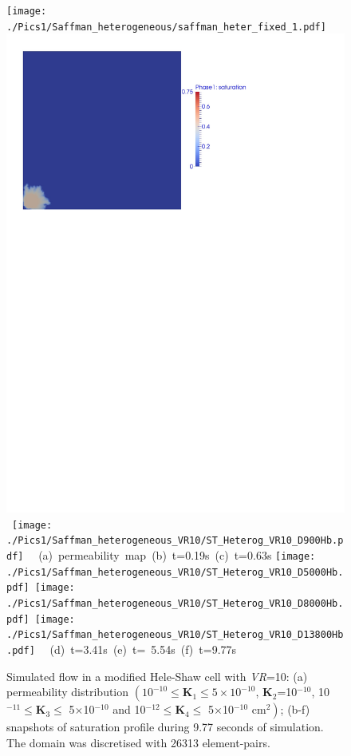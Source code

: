 \begin{landscape}
  \begin{figure}[ht]
  \vbox{\vspace{-.5cm}
      \hbox{\texttt{[image: ./Pics1/Saffman\_heterogeneous/saffman\_heter\_fixed\_1.pdf]}
            \includegraphics[width=.57\textwidth]{./Pics1/Saffman_heterogeneous_VR10/ST_Heterog_VR10_D200Hbcd.pdf} 
            \texttt{[image: ./Pics1/Saffman\_heterogeneous\_VR10/ST\_Heterog\_VR10\_D900Hb.pdf]} }
      \hbox{\hspace{1.0cm} (a) permeability map \hspace{3.cm} (b) t=0.19s \hspace{4.0cm} (c) t=0.63s}
      \vspace{0.5cm}
      \hbox{\texttt{[image: ./Pics1/Saffman\_heterogeneous\_VR10/ST\_Heterog\_VR10\_D5000Hb.pdf]}
            \texttt{[image: ./Pics1/Saffman\_heterogeneous\_VR10/ST\_Heterog\_VR10\_D8000Hb.pdf]}
            \texttt{[image: ./Pics1/Saffman\_heterogeneous\_VR10/ST\_Heterog\_VR10\_D13800Hb.pdf]} }
      \hbox{\hspace{2.cm} (d) t=3.41s \hspace{3.5cm} (e) t= 5.54s\hspace{4.5cm} (f) t=9.77s }}
\caption{Simulated flow in a modified Hele-Shaw cell with {\it VR}=10: (a) permeability distribution $\left(\text{10}^{-10}\le\mathbf{K}_{1}\le\text{5}\times\text{10}^{-10}\right.$, {\bf K}$_{2}$=10$^{-10}$, 10$^{-11}\le\mathbf{K}_{3}\le$ 5$\times$10$^{-10}$ and 10$^{-12}\le\mathbf{K}_{4}\le$ 5$\times$10$\left.^{-10}\text{ cm}^{2}\right)$; (b-f) snapshots of saturation profile during 9.77 seconds of simulation. The domain was discretised with 26313  element-pairs.}
\label{fig:HeleShawHeter_VR10}
\end{figure}
\end{landscape}
\clearpage


